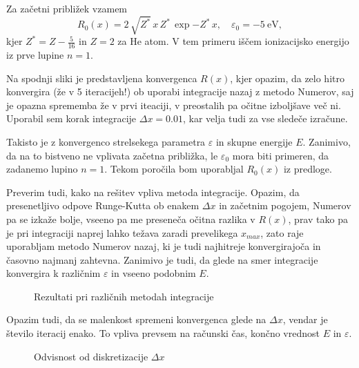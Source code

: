 Za začetni približek vzamem
\begin{equation}
    R_0(x)=2\,\sqrt{Z^*}\,x\,Z^*\,\exp{-Z^*\,x},\quad \varepsilon_0=-5~\text{eV},
\end{equation}
kjer $Z^*=Z-\frac{5}{16}$ in $Z=2$ za He atom. V tem primeru iščem ionizacijsko energijo iz prve lupine $n=1$.

Na spodnji sliki je predstavljena konvergenca $R(x)$, kjer opazim, da zelo hitro konvergira (že v 5 iteracijeh!) ob uporabi integracije nazaj z metodo Numerov, saj je opazna sprememba že v prvi iteaciji, v preostalih pa očitne izboljšave več ni. Uporabil sem korak integracije $\Delta x=0.01$, kar velja tudi za vse sledeče izračune.


Takisto je z konvergenco strelsekega parametra $\varepsilon$ in skupne energije $E$. Zanimivo, da na to bistveno ne vplivata začetna približka, le $\varepsilon_0$ mora biti primeren, da zadanemo lupino $n=1$. Tekom poročila bom uporabljal $R_0(x)$ iz predloge.

Preverim tudi, kako na rešitev vpliva metoda integracije. Opazim, da presenetljivo odpove Runge-Kutta ob enakem $\Delta x$ in začetnim pogojem, Numerov pa se izkaže bolje, vseeno pa me preseneča očitna razlika v $R(x)$, prav tako pa je pri integraciji naprej lahko težava zaradi prevelikega $x_{max}$, zato raje uporabljam metodo Numerov nazaj, ki je tudi najhitreje konvergirajoča in časovno najmanj zahtevna. Zanimivo je tudi, da glede na smer integracije konvergira k različnim $\varepsilon$ in vseeno podobnim $E$.
\begin{figure}[H]
    \centering
    \caption{Rezultati pri različnih metodah integracije}
\end{figure}

Opazim tudi, da se malenkost spremeni konvergenca glede na $\Delta x$, vendar je število iteracij enako. To vpliva prevsem na računski čas, končno vrednost $E$ in $\varepsilon$.
\begin{figure}[H]
    \centering
    \caption{Odvisnost od diskretizacije $\Delta x$}
\end{figure}

